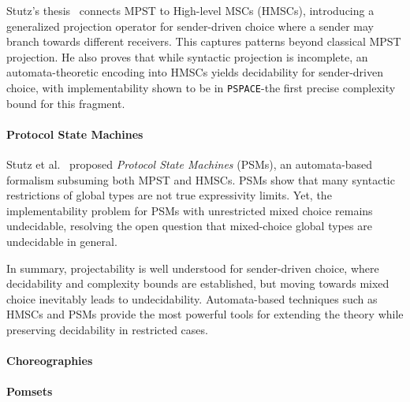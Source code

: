 Stutz’s thesis~\cite{stutz2024implementability} connects MPST to 
High-level MSCs (HMSCs), introducing a generalized projection operator 
for sender-driven choice where a sender may branch towards different 
receivers. This captures patterns beyond classical MPST projection.  
He also proves that while syntactic projection is incomplete, 
an automata-theoretic encoding into HMSCs yields decidability for 
sender-driven choice, with implementability shown to be in 
\verb|PSPACE|-the first precise complexity bound for this fragment.


\paragraph{Protocol State Machines}
Stutz et al.~\cite{stutz2025automata} proposed \emph{Protocol State Machines} 
(PSMs), an automata-based formalism subsuming both MPST and HMSCs. 
PSMs show that many syntactic restrictions of global types are not 
true expressivity limits. Yet, the implementability problem for PSMs 
with unrestricted mixed choice remains undecidable, resolving the 
open question that mixed-choice global types are undecidable in general.  

In summary, projectability is well understood for sender-driven choice, 
where decidability and complexity bounds are established, but moving 
towards mixed choice inevitably leads to undecidability. Automata-based 
techniques such as HMSCs and PSMs provide the most powerful tools for 
extending the theory while preserving decidability in restricted cases.

\paragraph{Choreographies}


\paragraph{Pomsets}
